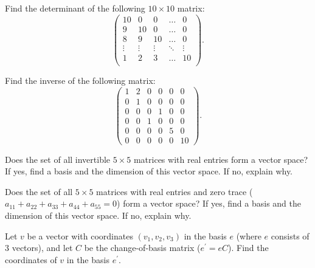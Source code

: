 \begin{problem}
 Find the determinant of the following $10 \times 10$ matrix:
$$
\begin{pmatrix}
    10 & 0 & 0 & \dots & 0 \\
    9 & 10 & 0 & \dots & 0 \\
    8 & 9 & 10 & \dots & 0 \\
    \vdots & \vdots & \vdots & \ddots & \vdots \\
    1 & 2 & 3 & \dots & 10 \\
\end{pmatrix}.
$$
\end{problem}

\begin{problem}
    Find the inverse of the following matrix:
$$
\begin{pmatrix}
    1 & 2 & 0 & 0 & 0 & 0 \\
    0 & 1 & 0 & 0 & 0 & 0 \\
    0 & 0 & 0 & 1 & 0 & 0 \\
    0 & 0 & 1 & 0 & 0 & 0 \\
    0 & 0 & 0 & 0 & 5 & 0 \\
    0 & 0 & 0 & 0 & 0 & 10
\end{pmatrix}.
$$
\end{problem}

\begin{problem}
Does the set of all invertible $5 \times 5$ matrices with real entries form a vector space? If yes, find a basis and the dimension of this vector space. If no, explain why.
\end{problem}

\begin{problem}
Does the set of all $5 \times 5$ matrices with real entries and zero trace ($a_{11} + a_{22} + a_{33} + a_{44} + a_{55} = 0$) form a vector space? If yes, find a basis and the dimension of this vector space. If no, explain why.
\end{problem}

\begin{problem}
Let $v$ be a vector with coordinates $(v_1, v_2, v_3)$ in the basis $e$ (where $e$ consists of 3 vectors), and let $C$ be the change-of-basis matrix ($e^{\prime} = eC$). Find the coordinates of $v$ in the basis $e^{\prime}$.  
\end{problem}